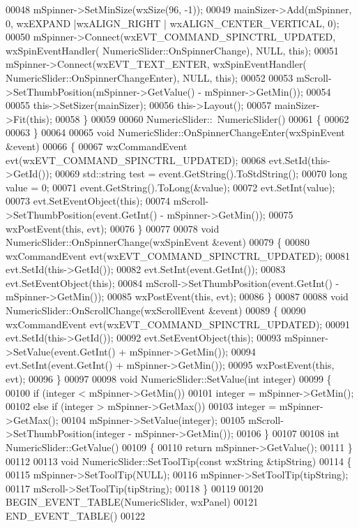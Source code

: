\begin{DoxyCode}
00048     mSpinner->SetMinSize(wxSize(96, -1));
00049     mainSizer->Add(mSpinner, 0, wxEXPAND |wxALIGN\_RIGHT | wxALIGN\_CENTER\_VERTICAL, 0);
00050     mSpinner->Connect(wxEVT\_COMMAND\_SPINCTRL\_UPDATED, wxSpinEventHandler(
      NumericSlider::OnSpinnerChange), NULL, \textcolor{keyword}{this});
00051     mSpinner->Connect(wxEVT\_TEXT\_ENTER, wxSpinEventHandler(
      NumericSlider::OnSpinnerChangeEnter), NULL, \textcolor{keyword}{this});
00052 
00053     mScroll->SetThumbPosition(mSpinner->GetValue() - mSpinner->GetMin());
00054 
00055     this->SetSizer(mainSizer);
00056     this->Layout();
00057     mainSizer->Fit(\textcolor{keyword}{this});
00058 \}
00059 
00060 NumericSlider::~NumericSlider()
00061 \{
00062 
00063 \}
00064 
00065 \textcolor{keywordtype}{void} NumericSlider::OnSpinnerChangeEnter(wxSpinEvent &event)
00066 \{
00067     wxCommandEvent evt(wxEVT\_COMMAND\_SPINCTRL\_UPDATED);
00068     evt.SetId(this->GetId());
00069     std::string test = \textcolor{keyword}{event}.GetString().ToStdString();
00070     \textcolor{keywordtype}{long} value = 0;
00071     \textcolor{keyword}{event}.GetString().ToLong(&value);
00072     evt.SetInt(value);
00073     evt.SetEventObject(\textcolor{keyword}{this});
00074     mScroll->SetThumbPosition(event.GetInt() - mSpinner->GetMin());
00075     wxPostEvent(\textcolor{keyword}{this}, evt);
00076 \}
00077 
00078 \textcolor{keywordtype}{void} NumericSlider::OnSpinnerChange(wxSpinEvent &event)
00079 \{
00080     wxCommandEvent evt(wxEVT\_COMMAND\_SPINCTRL\_UPDATED);
00081     evt.SetId(this->GetId());
00082     evt.SetInt(event.GetInt());
00083     evt.SetEventObject(\textcolor{keyword}{this});
00084     mScroll->SetThumbPosition(event.GetInt() - mSpinner->GetMin());
00085     wxPostEvent(\textcolor{keyword}{this}, evt);
00086 \}
00087 
00088 \textcolor{keywordtype}{void} NumericSlider::OnScrollChange(wxScrollEvent &event)
00089 \{
00090     wxCommandEvent evt(wxEVT\_COMMAND\_SPINCTRL\_UPDATED);
00091     evt.SetId(this->GetId());
00092     evt.SetEventObject(\textcolor{keyword}{this});
00093     mSpinner->SetValue(event.GetInt() + mSpinner->GetMin());
00094     evt.SetInt(event.GetInt() + mSpinner->GetMin());
00095     wxPostEvent(\textcolor{keyword}{this}, evt);
00096 \}
00097 
00098 \textcolor{keywordtype}{void} NumericSlider::SetValue(\textcolor{keywordtype}{int} integer)
00099 \{
00100     \textcolor{keywordflow}{if} (integer < mSpinner->GetMin())
00101         integer = mSpinner->GetMin();
00102     \textcolor{keywordflow}{else} \textcolor{keywordflow}{if} (integer > mSpinner->GetMax())
00103         integer = mSpinner->GetMax();
00104     mSpinner->SetValue(integer);
00105     mScroll->SetThumbPosition(integer - mSpinner->GetMin());
00106 \}
00107 
00108 \textcolor{keywordtype}{int} NumericSlider::GetValue()
00109 \{
00110     \textcolor{keywordflow}{return} mSpinner->GetValue();
00111 \}
00112 
00113 \textcolor{keywordtype}{void} NumericSlider::SetToolTip(\textcolor{keyword}{const} wxString &tipString)
00114 \{
00115     mSpinner->SetToolTip(NULL);
00116     mSpinner->SetToolTip(tipString);
00117     mScroll->SetToolTip(tipString);
00118 \}
00119 
00120 BEGIN\_EVENT\_TABLE(NumericSlider, wxPanel)
00121 END\_EVENT\_TABLE()
00122 
\end{DoxyCode}

